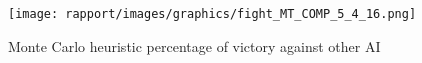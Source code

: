         \begin{figure}[H]
            \centering
            \texttt{[image: rapport/images/graphics/fight\_MT\_COMP\_5\_4\_16.png]}
            \caption{Monte Carlo heuristic percentage of victory against other AI}
            \label{perf_monte_carlo_compose_against}

        \end{figure}
        
   
        
        


        
    